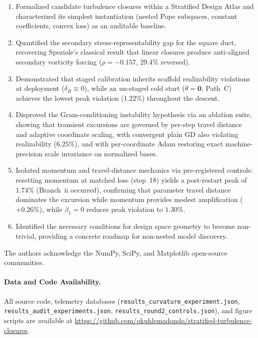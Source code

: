 \documentclass[preprint,aps,prb,longbibliography,superscriptaddress]{revtex4-2}
\begin{document}
\begin{enumerate}
  \item Formalized candidate turbulence closures within a Stratified Design
    Atlas and characterized its simplest instantiation (nested Pope subspaces,
    constant coefficients, convex loss) as an auditable baseline.
  \item Quantified the secondary stress-representability gap for the square
    duct, recovering Speziale's classical result that linear closures produce
    anti-aligned secondary vorticity forcing ($\rho = -0.157$, $29.4\%$ reversed).
  \item Demonstrated that staged calibration inherits scaffold realizability
    violations at deployment ($\delta_R \equiv 0$), while an un-staged cold start
    ($\theta = \mathbf{0}$, Path~C) achieves the lowest peak violation ($1.22\%$)
    throughout the descent.
  \item Disproved the Gram-conditioning instability hypothesis via an ablation
    suite, showing that transient excursions are governed by per-step travel
    distance and adaptive coordinate scaling, with convergent plain GD also
    violating realizability ($6.25\%$), and with per-coordinate Adam restoring
    exact machine-precision scale invariance on normalized bases.
  \item Isolated momentum and travel-distance mechanics via pre-registered controls:
    resetting momentum at matched loss (step~18) yields a post-restart peak of $1.74\%$
    (Branch~ii occurred), confirming that parameter travel
    distance dominates the excursion while momentum provides modest amplification
    ($+0.26\%$), while $\beta_1 = 0$ reduces peak violation to $1.30\%$.
  \item Identified the necessary conditions for design space geometry to become
    non-trivial, providing a concrete roadmap for non-nested model discovery.
\end{enumerate}

\begin{acknowledgments}
The authors acknowledge the NumPy, SciPy, and Matplotlib open-source communities.
\end{acknowledgments}

\paragraph*{Data and Code Availability.}
All source code, telemetry databases (\texttt{results\_curvature\_experiment.json},
\texttt{results\_audit\_experiments.json}, \texttt{results\_round2\_controls.json}),
and figure scripts are available at
\url{https://github.com/okuhlemadondo/stratified-turbulence-closures}.
\end{document}
